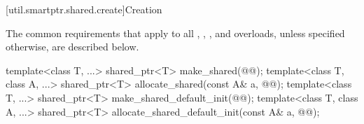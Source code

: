 [util.smartptr.shared.create]{Creation}

\pnum
The common requirements that apply to all
,
,
, and
 overloads,
unless specified otherwise, are described below.

%
%
\begin{itemdecl}
template<class T, ...>
  shared_ptr<T> make_shared(@@);
template<class T, class A, ...>
  shared_ptr<T> allocate_shared(const A& a, @@);
template<class T, ...>
  shared_ptr<T> make_shared_default_init(@@);
template<class T, class A, ...>
  shared_ptr<T> allocate_shared_default_init(const A& a, @@);
\end{itemdecl}

